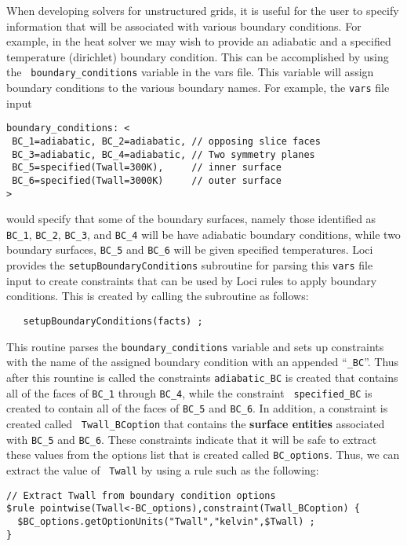 \documentclass[10pt,epsf]{book}
\begin{document}
When developing solvers for unstructured grids, it is useful for the
user to specify information that will be associated with various
boundary conditions.  For example, in the heat solver we may wish to
provide an adiabatic and a specified temperature (dirichlet) boundary
condition.  This can be accomplished by using the {\tt
  boundary\_conditions} variable in the vars file.  This variable will
assign boundary conditions to the various boundary names.  For
example, the {\tt vars} file input
\begin{verbatim}
boundary_conditions: <
 BC_1=adiabatic, BC_2=adiabatic, // opposing slice faces
 BC_3=adiabatic, BC_4=adiabatic, // Two symmetry planes
 BC_5=specified(Twall=300K),     // inner surface
 BC_6=specified(Twall=3000K)     // outer surface
>
\end{verbatim}
would specify that some of the boundary surfaces, namely those
identified as {\tt BC\_1}, {\tt BC\_2}, {\tt BC\_3}, and {\tt BC\_4}
will be have adiabatic boundary conditions, while two boundary
surfaces, {\tt BC\_5} and {\tt BC\_6} will be given specified
temperatures.  Loci provides the {\tt setupBoundaryConditions}
subroutine for parsing this {\tt vars} file input to create
constraints that can be used by Loci rules to apply boundary
conditions.  This is created by calling the subroutine as follows:
\begin{verbatim}
   setupBoundaryConditions(facts) ;
\end{verbatim}
This routine parses the {\tt boundary\_conditions} variable and sets
up constraints with the name of the assigned boundary condition with
an appended ``{\tt \_BC}''.  Thus after this rountine is called the
constraints {\tt adiabatic\_BC} is created that contains all of the
faces of {\tt BC\_1} through {\tt BC\_4}, while the constraint {\tt
  specified\_BC} is created to contain all of the faces of {\tt BC\_5}
and {\tt BC\_6}.  In addition, a constraint is created called {\tt
  Twall\_BCoption} that contains the {\bf surface entities} associated with
{\tt BC\_5} and {\tt BC\_6}.  These constraints indicate that it will
be safe to extract these values from the options list that is created
called {\tt BC\_options}.  Thus, we can extract the value of {\tt
  Twall} by using a rule such as the following:
\begin{verbatim}
// Extract Twall from boundary condition options
$rule pointwise(Twall<-BC_options),constraint(Twall_BCoption) {
  $BC_options.getOptionUnits("Twall","kelvin",$Twall) ;
}
\end{verbatim}
\end{document}
